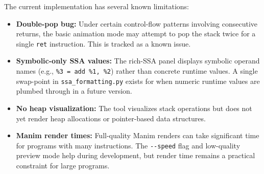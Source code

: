 The current implementation has several known limitations:

\begin{itemize}
    \item \textbf{Double-pop bug:} Under certain control-flow patterns involving consecutive returns, the basic animation mode may attempt to pop the stack twice for a single \texttt{ret} instruction. This is tracked as a known issue.

    \item \textbf{Symbolic-only SSA values:} The rich-SSA panel displays symbolic operand names (e.g., \texttt{\%3 = add \%1, \%2}) rather than concrete runtime values. A single swap-point in \texttt{ssa\_formatting.py} exists for when numeric runtime values are plumbed through in a future version.

    \item \textbf{No heap visualization:} The tool visualizes stack operations but does not yet render heap allocations or pointer-based data structures.

    \item \textbf{Manim render times:} Full-quality Manim renders can take significant time for programs with many instructions. The \texttt{-{}-speed} flag and low-quality preview mode help during development, but render time remains a practical constraint for large programs.
\end{itemize}
